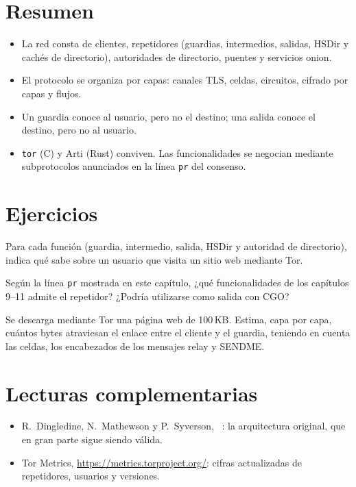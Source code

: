 \section*{Resumen}
\begin{itemize}
  \item La red consta de clientes, repetidores (guardias, intermedios, salidas, HSDir y cachés de directorio), autoridades de directorio, puentes y servicios onion.
  \item El protocolo se organiza por capas: canales TLS, celdas, circuitos, cifrado por capas y flujos.
  \item Un guardia conoce al usuario, pero no el destino; una salida conoce el destino, pero no al usuario.
  \item \texttt{tor} (C) y Arti (Rust) conviven. Las funcionalidades se negocian mediante subprotocolos anunciados en la línea \texttt{pr} del consenso.
\end{itemize}

\section*{Ejercicios}

\begin{esercizio}[1]\label{es:06-vista}
Para cada función (guardia, intermedio, salida, HSDir y autoridad de directorio), indica qué sabe sobre un usuario que visita un sitio web mediante Tor.
\end{esercizio}

\begin{esercizio}[1]\label{es:06-pr}
Según la línea \texttt{pr} mostrada en este capítulo, ¿qué funcionalidades de los capítulos 9--11 admite el repetidor? ¿Podría utilizarse como salida con CGO?
\end{esercizio}

\begin{esercizio}[2]\label{es:06-livelli}
Se descarga mediante Tor una página web de 100\,KB. Estima, capa por capa, cuántos bytes atraviesan el enlace entre el cliente y el guardia, teniendo en cuenta las celdas, los encabezados de los mensajes relay y SENDME.
\end{esercizio}

\section*{Lecturas complementarias}
\begin{itemize}
  \item R.~Dingledine, N.~Mathewson y P.~Syverson, ~\cite{dingledine2004tor}: la arquitectura original, que en gran parte sigue siendo válida.
  \item Tor Metrics, \url{https://metrics.torproject.org/}: cifras actualizadas de repetidores, usuarios y versiones.
\end{itemize}
